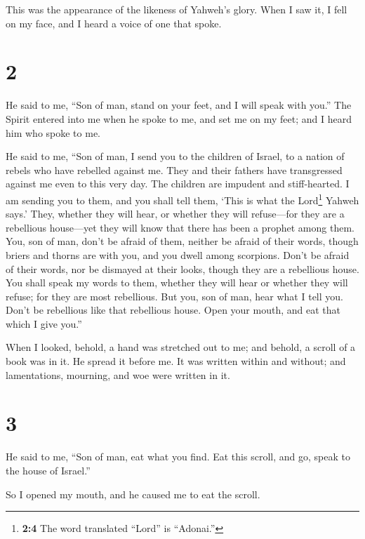 This was the appearance of the likeness of Yahweh's glory. When I saw
it, I fell on my face, and I heard a voice of one that spoke.

\hypertarget{section-1}{%
\section{2}\label{section-1}}

 He said to me, ``Son of man, stand on your feet, and I
will speak with you.''  The Spirit entered into me when he
spoke to me, and set me on my feet; and I heard him who spoke to me.

 He said to me, ``Son of man, I send you to the children
of Israel, to a nation of rebels who have rebelled against me. They and
their fathers have transgressed against me even to this very day.
 The children are impudent and stiff-hearted. I am sending
you to them, and you shall tell them, `This is what the Lord\footnote{\textbf{2:4}
  The word translated ``Lord'' is ``Adonai.''} Yahweh says.'
 They, whether they will hear, or whether they will
refuse---for they are a rebellious house---yet they will know that there
has been a prophet among them.  You, son of man, don't be
afraid of them, neither be afraid of their words, though briers and
thorns are with you, and you dwell among scorpions. Don't be afraid of
their words, nor be dismayed at their looks, though they are a
rebellious house.  You shall speak my words to them,
whether they will hear or whether they will refuse; for they are most
rebellious.  But you, son of man, hear what I tell you.
Don't be rebellious like that rebellious house. Open your mouth, and eat
that which I give you.''

 When I looked, behold, a hand was stretched out to me;
and behold, a scroll of a book was in it.  He spread it
before me. It was written within and without; and lamentations,
mourning, and woe were written in it.

\hypertarget{section-2}{%
\section{3}\label{section-2}}

 He said to me, ``Son of man, eat what you find. Eat this
scroll, and go, speak to the house of Israel.''

 So I opened my mouth, and he caused me to eat the scroll.


